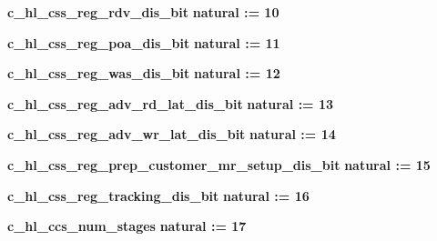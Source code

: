 \begin{DoxyCompactItemize}
\item 
{\bf c\+\_\+hl\+\_\+css\+\_\+reg\+\_\+rdv\+\_\+dis\+\_\+bit} {\bfseries \textcolor{comment}{natural}\textcolor{vhdlchar}{ }\textcolor{vhdlchar}{ }\textcolor{vhdlchar}{\+:}\textcolor{vhdlchar}{=}\textcolor{vhdlchar}{ }\textcolor{vhdlchar}{ } \textcolor{vhdldigit}{10} \textcolor{vhdlchar}{ }} 
\item 
{\bf c\+\_\+hl\+\_\+css\+\_\+reg\+\_\+poa\+\_\+dis\+\_\+bit} {\bfseries \textcolor{comment}{natural}\textcolor{vhdlchar}{ }\textcolor{vhdlchar}{ }\textcolor{vhdlchar}{\+:}\textcolor{vhdlchar}{=}\textcolor{vhdlchar}{ }\textcolor{vhdlchar}{ } \textcolor{vhdldigit}{11} \textcolor{vhdlchar}{ }} 
\item 
{\bf c\+\_\+hl\+\_\+css\+\_\+reg\+\_\+was\+\_\+dis\+\_\+bit} {\bfseries \textcolor{comment}{natural}\textcolor{vhdlchar}{ }\textcolor{vhdlchar}{ }\textcolor{vhdlchar}{\+:}\textcolor{vhdlchar}{=}\textcolor{vhdlchar}{ }\textcolor{vhdlchar}{ } \textcolor{vhdldigit}{12} \textcolor{vhdlchar}{ }} 
\item 
{\bf c\+\_\+hl\+\_\+css\+\_\+reg\+\_\+adv\+\_\+rd\+\_\+lat\+\_\+dis\+\_\+bit} {\bfseries \textcolor{comment}{natural}\textcolor{vhdlchar}{ }\textcolor{vhdlchar}{ }\textcolor{vhdlchar}{\+:}\textcolor{vhdlchar}{=}\textcolor{vhdlchar}{ }\textcolor{vhdlchar}{ } \textcolor{vhdldigit}{13} \textcolor{vhdlchar}{ }} 
\item 
{\bf c\+\_\+hl\+\_\+css\+\_\+reg\+\_\+adv\+\_\+wr\+\_\+lat\+\_\+dis\+\_\+bit} {\bfseries \textcolor{comment}{natural}\textcolor{vhdlchar}{ }\textcolor{vhdlchar}{ }\textcolor{vhdlchar}{\+:}\textcolor{vhdlchar}{=}\textcolor{vhdlchar}{ }\textcolor{vhdlchar}{ } \textcolor{vhdldigit}{14} \textcolor{vhdlchar}{ }} 
\item 
{\bf c\+\_\+hl\+\_\+css\+\_\+reg\+\_\+prep\+\_\+customer\+\_\+mr\+\_\+setup\+\_\+dis\+\_\+bit} {\bfseries \textcolor{comment}{natural}\textcolor{vhdlchar}{ }\textcolor{vhdlchar}{ }\textcolor{vhdlchar}{\+:}\textcolor{vhdlchar}{=}\textcolor{vhdlchar}{ }\textcolor{vhdlchar}{ } \textcolor{vhdldigit}{15} \textcolor{vhdlchar}{ }} 
\item 
{\bf c\+\_\+hl\+\_\+css\+\_\+reg\+\_\+tracking\+\_\+dis\+\_\+bit} {\bfseries \textcolor{comment}{natural}\textcolor{vhdlchar}{ }\textcolor{vhdlchar}{ }\textcolor{vhdlchar}{\+:}\textcolor{vhdlchar}{=}\textcolor{vhdlchar}{ }\textcolor{vhdlchar}{ } \textcolor{vhdldigit}{16} \textcolor{vhdlchar}{ }} 
\item 
{\bf c\+\_\+hl\+\_\+ccs\+\_\+num\+\_\+stages} {\bfseries \textcolor{comment}{natural}\textcolor{vhdlchar}{ }\textcolor{vhdlchar}{ }\textcolor{vhdlchar}{\+:}\textcolor{vhdlchar}{=}\textcolor{vhdlchar}{ }\textcolor{vhdlchar}{ } \textcolor{vhdldigit}{17} \textcolor{vhdlchar}{ }} 

\end{DoxyCompactItemize}
